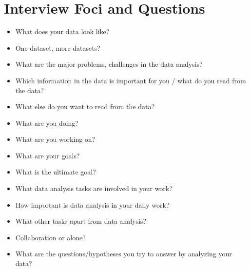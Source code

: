 \begin{table}
\begin{center}
    \label{tab:interviews}
    \end{center}
\end{table}




\section{Interview Foci and Questions}
\label{app:drvistasks:interview-foci}



\begin{itemize}
    \item What does your data look like?
    \item One dataset, more datasets?
    \item What are the major problems, challenges in the data analysis?
    \item Which information in the data is important for you / what do you read from the data?
    \item What else do you want to read from the data?
\end{itemize}


\begin{itemize}
    \item What are you doing?
    \item What are you working on?
    \item What are your goals?
    \item What is the ultimate goal?
    \item What data analysis tasks are involved in your work?
    \item How important is data analysis in your daily work?
    \item What other tasks apart from data analysis?
    \item Collaboration or alone?
    \item What are the questions/hypotheses you try to answer by analyzing your data?
\end{itemize}

